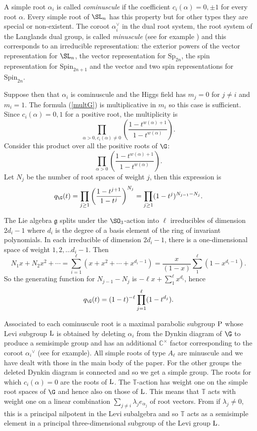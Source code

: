 \documentclass[12pt]{article}
\numberwithin{equation}{section}
\theoremstyle{remark}
\theoremstyle{definition}
\numberwithin{theorem}{section}
\newcommand{\lie}[1]{\mathfrak{#1}}
\def\C{\mathbb{C}}
\newcommand{\T}{{\mathbb{T}}}
\renewcommand{\1}{\mathbbm{1}}
\begin{document}
A simple root $\alpha_i$ is called {\it cominuscule} if the coefficient $c_i(\alpha)=0,\pm1$ for every root $\alpha$.  Every simple root of $\SL_n$ has this property but for other types  they are special or non-existent. The coroot $\alpha_i^{\vee}$ in the dual root system, the root system of the Langlands dual group, is called {\it minuscule} (see for example \cite{Buch}) and this corresponds to an irreducible representation: the exterior powers of the vector representation for $\SL_n$, the vector representation for $\mathrm{Sp}_{2n}$, the spin representation for $\mathrm{Spin}_{2n+1}$ and the vector and two spin representations for $\mathrm{Spin}_{2n}$.


Suppose then that $\alpha_i$ is cominuscule and the Higgs field has $m_j=0$ for $j\ne i$ and $m_i=1$. The formula (\ref{multG}) is multiplicative in $m_i$ so this case is sufficient. Since $c_i(\alpha)=0,1$ for a positive root, the multiplicity is 
$$\prod_{\alpha>0, c_i(\alpha)\ne 0}\left(\frac{1-t^{w(\alpha)+1}}{1-t^{w(\alpha)}}\right). $$
Consider this product over all the positive roots of $\G$:
$$\prod_{\alpha>0}\left(\frac{1-t^{w(\alpha)+1}}{1-t^{w(\alpha)}}\right). $$
Let $N_j$ be the number of root spaces of weight $j$, then this expression is
$$q_\G(t)=\prod_{j\ge 1}\left(\frac{1-t^{j+1}}{1-t^{j}}\right)^{N_j}= \prod_{j\ge 1}(1-t^{j})^{N_{j-1}-N_j}.$$

The Lie algebra $\lie{g}$ splits under the $\SO_3$-action into $\ell$  irreducibles of dimension $2d_i-1$ where $d_i$ is the degree of a basis element of the ring of invariant polynomials. In each irreducible of dimension $2d_i-1$, there is a one-dimensional space of weight $1,2,\dots d_i-1$. Then $$N_1x+N_2x^2+\cdots =\sum_{i=1}^{\ell}(x+x^2+\cdots + x^{d_i-1})=\frac{x}{(1-x)}\sum_1^{\ell}(1-x^{d_i-1}).$$
So the generating function for $N_{j-1}-N_j$ is 
$-\ell x+\sum_1^{\ell}x^{d_i}$, hence 
\begin{equation}
q_\G(t)=(1-t)^{-{\ell}}  \prod_{j=1}^{\ell}(1-t^{d_j}).
\label{qG}
\end{equation} 

Associated to each cominuscule root is a maximal parabolic subgroup $\rm P$ whose Levi subgroup $\rm L$  is obtained by deleting $\alpha_i$ from the Dynkin diagram of $\G$ to produce a semisimple group and  has an additional $\C^\times$ factor corresponding to the coroot ${\alpha_i}^{\vee}$ (see \cite{Buch} for example). All simple roots of type $A_{\ell}$ are minuscule and we have dealt with those in the main body of the paper. For  the other groups the deleted Dynkin diagram is connected and so we get a simple group. The roots for which $c_i(\alpha)=0$ are the roots of $\rm L$.  The $\T$-action has weight one on  the simple root spaces  of $\G$ and hence also  on those of $\rm L$. This means that $\T$ acts with weight one on a linear combination $\sum_{j\ne i} \lambda_je_{\alpha_j}$ of root vectors. From \cite{Kos} if $\lambda_j\ne 0$, this is a principal nilpotent in the Levi subalgebra and so $\T$ acts as a semisimple element in a principal three-dimensional subgroup of the Levi group $\rm L$. 
\end{document}
